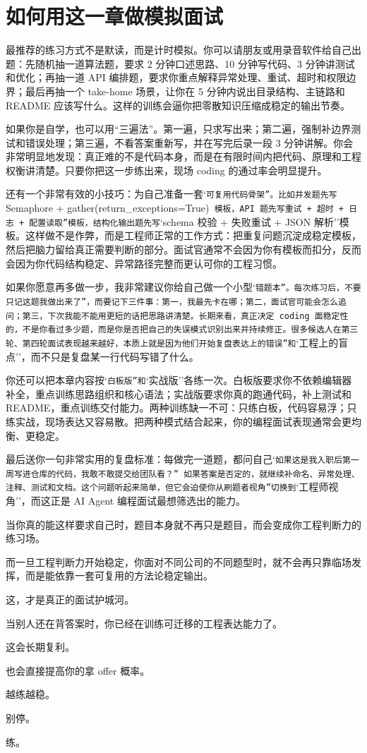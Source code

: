 \section{如何用这一章做模拟面试}

最推荐的练习方式不是默读，而是计时模拟。你可以请朋友或用录音软件给自己出题：先随机抽一道算法题，要求 2 分钟口述思路、10 分钟写代码、3 分钟讲测试和优化；再抽一道 API 编排题，要求你重点解释异常处理、重试、超时和权限边界；最后再抽一个 take-home 场景，让你在 5 分钟内说出目录结构、主链路和 README 应该写什么。这样的训练会逼你把零散知识压缩成稳定的输出节奏。


如果你是自学，也可以用``三遍法''。第一遍，只求写出来；第二遍，强制补边界测试和错误处理；第三遍，不看答案重新写，并在写完后录一段 3 分钟讲解。你会非常明显地发现：真正难的不是代码本身，而是在有限时间内把代码、原理和工程权衡讲清楚。只要你把这一步练出来，现场 coding 的通过率会明显提升。


还有一个非常有效的小技巧：为自己准备一套`\texttt{可复用代码骨架''。比如并发题先写 }Semaphore + gather(return\_exceptions=True)\texttt{ 模板，API 题先写}\texttt{重试 + 超时 + 日志 + 配置读取''模板，结构化输出题先写}`schema 校验 + 失败重试 + JSON 解析''模板。这样做不是作弊，而是工程师正常的工作方式：把重复问题沉淀成稳定模板，然后把脑力留给真正需要判断的部分。面试官通常不会因为你有模板而扣分，反而会因为你代码结构稳定、异常路径完整而更认可你的工程习惯。


如果你愿意再多做一步，我非常建议你给自己做一个小型`\texttt{错题本''。每次练习后，不要只记}\texttt{这题我做出来了''，而要记下三件事：第一，我最先卡在哪；第二，面试官可能会怎么追问；第三，下次我能不能用更短的话把思路讲清楚。长期来看，真正决定 coding 面稳定性的，不是你看过多少题，而是你是否把自己的失误模式识别出来并持续修正。很多候选人在第三轮、第四轮面试表现越来越好，本质上就是因为他们开始复盘}\texttt{表达上的错误''和}`工程上的盲点''，而不只是复盘某一行代码写错了什么。


你还可以把本章内容按`\texttt{白板版''和}`实战版''各练一次。白板版要求你不依赖编辑器补全，重点训练思路组织和核心语法；实战版要求你真的跑通代码，补上测试和 README，重点训练交付能力。两种训练缺一不可：只练白板，代码容易浮；只练实战，现场表达又容易散。把两种模式结合起来，你的编程面试表现通常会更均衡、更稳定。


最后送你一句非常实用的复盘标准：每做完一道题，都问自己`\texttt{如果这是我入职后第一周写进仓库的代码，我敢不敢提交给团队看？'' 如果答案是否定的，就继续补命名、异常处理、注释、测试和文档。这个问题听起来简单，但它会迫使你从}\texttt{刷题者视角''切换到}`工程师视角''，而这正是 AI Agent 编程面试最想筛选出的能力。


当你真的能这样要求自己时，题目本身就不再只是题目，而会变成你工程判断力的练习场。


而一旦工程判断力开始稳定，你面对不同公司的不同题型时，就不会再只靠临场发挥，而是能依靠一套可复用的方法论稳定输出。


这，才是真正的面试护城河。


当别人还在背答案时，你已经在训练可迁移的工程表达能力了。


这会长期复利。


也会直接提高你的拿 offer 概率。


越练越稳。


别停。


练。
